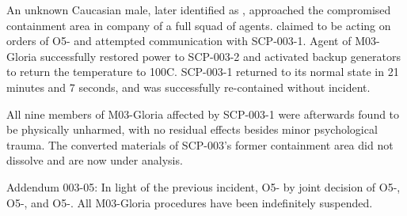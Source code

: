 An unknown Caucasian male, later identified as \redacted, approached the compromised containment area in company of a full squad of agents. \redacted claimed to be acting on orders of O5- and attempted communication with SCP-003-1. \expunged Agent  of M03-Gloria successfully restored power to SCP-003-2 and activated backup generators to return the temperature to 100\degree C. SCP-003-1 returned to its normal state in 21 minutes and 7 seconds, and was successfully re-contained without incident.

All nine members of M03-Gloria affected by SCP-003-1 were afterwards found to be physically unharmed, with no residual effects besides minor psychological trauma. The converted materials of SCP-003's former containment area did not dissolve and are now under analysis.

Addendum 003-05: In light of the previous incident, O5- \expunged by joint decision of O5-, O5-, and O5-. All M03-Gloria procedures have been indefinitely suspended.

